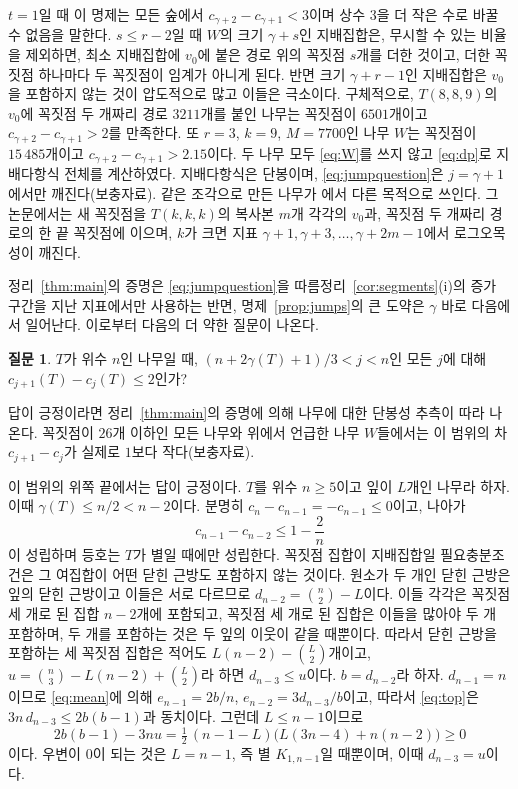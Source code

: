 \documentclass[11pt,a4paper]{article}
\theoremstyle{definition}
\newtheorem{question}[theorem]{질문}
\begin{document}
$t=1$일 때 이 명제는 모든 숲에서 $c_{\gamma+2}-c_{\gamma+1}<3$이며 상수 $3$을 더 작은
수로 바꿀 수 없음을 말한다. $s\le r-2$일 때 $W$의 크기 $\gamma+s$인 지배집합은, 무시할
수 있는 비율을 제외하면, 최소 지배집합에 $v_0$에 붙은 경로 위의 꼭짓점 $s$개를 더한
것이고, 더한 꼭짓점 하나마다 두 꼭짓점이 임계가 아니게 된다. 반면 크기 $\gamma+r-1$인
지배집합은 $v_0$을 포함하지 않는 것이 압도적으로 많고 이들은 극소이다. 구체적으로,
$T(8,8,9)$의 $v_0$에 꼭짓점 두 개짜리 경로 $3211$개를 붙인 나무는 꼭짓점이 $6501$개이고
$c_{\gamma+2}-c_{\gamma+1}>2$를 만족한다. 또 $r=3$, $k=9$, $M=7700$인 나무 $W$는
꼭짓점이 $15\,485$개이고 $c_{\gamma+2}-c_{\gamma+1}>2.15$이다. 두 나무 모두
\eqref{eq:W}를 쓰지 않고 \eqref{eq:dp}로 지배다항식 전체를 계산하였다. 지배다항식은
단봉이며, \eqref{eq:jumpquestion}은 $j=\gamma+1$에서만 깨진다(보충자료). 같은
조각으로 만든 나무가 \cite{DHP}에서 다른 목적으로 쓰인다. 그 논문에서는 새 꼭짓점을
$T(k,k,k)$의 복사본 $m$개 각각의 $v_0$과, 꼭짓점 두 개짜리 경로의 한 끝 꼭짓점에
이으며, $k$가 크면 지표 $\gamma+1,\gamma+3,\dots,\gamma+2m-1$에서 로그오목성이
깨진다.

정리~\ref{thm:main}의 증명은 \eqref{eq:jumpquestion}을
따름정리~\ref{cor:segments}(i)의 증가 구간을 지난 지표에서만 사용하는 반면,
명제~\ref{prop:jumps}의 큰 도약은 $\gamma$ 바로 다음에서 일어난다. 이로부터 다음의 더
약한 질문이 나온다.

\begin{question}\label{q:jump}
$T$가 위수 $n$인 나무일 때, $(n+2\gamma(T)+1)/3<j<n$인 모든 $j$에 대해
$c_{j+1}(T)-c_j(T)\le2$인가?
\end{question}

답이 긍정이라면 정리~\ref{thm:main}의 증명에 의해 나무에 대한 단봉성 추측이 따라
나온다. 꼭짓점이 $26$개 이하인 모든 나무와 위에서 언급한 나무 $W$들에서는 이 범위의 차
$c_{j+1}-c_j$가 실제로 $1$보다 작다(보충자료).

이 범위의 위쪽 끝에서는 답이 긍정이다. $T$를 위수 $n\ge5$이고 잎이 $L$개인 나무라 하자.
이때 $\gamma(T)\le n/2<n-2$이다. 분명히 $c_n-c_{n-1}=-c_{n-1}\le0$이고, 나아가
\begin{equation}\label{eq:top}
  c_{n-1}-c_{n-2}\le1-\frac2n
\end{equation}
이 성립하며 등호는 $T$가 별일 때에만 성립한다. 꼭짓점 집합이 지배집합일 필요충분조건은 그
여집합이 어떤 닫힌 근방도 포함하지 않는 것이다. 원소가 두 개인 닫힌 근방은 잎의 닫힌
근방이고 이들은 서로 다르므로 $d_{n-2}=\binom n2-L$이다. 이들 각각은 꼭짓점 세 개로 된
집합 $n-2$개에 포함되고, 꼭짓점 세 개로 된 집합은 이들을 많아야 두 개 포함하며, 두 개를
포함하는 것은 두 잎의 이웃이 같을 때뿐이다. 따라서 닫힌 근방을 포함하는 세 꼭짓점
집합은 적어도 $L(n-2)-\binom L2$개이고, $u=\binom n3-L(n-2)+\binom L2$라 하면
$d_{n-3}\le u$이다. $b=d_{n-2}$라 하자. $d_{n-1}=n$이므로 \eqref{eq:mean}에 의해
$e_{n-1}=2b/n$, $e_{n-2}=3d_{n-3}/b$이고, 따라서 \eqref{eq:top}은
$3n\,d_{n-3}\le2b(b-1)$과 동치이다. 그런데 $L\le n-1$이므로
\[
  2b(b-1)-3nu=\tfrac12\,(n-1-L)\bigl(L(3n-4)+n(n-2)\bigr)\ge0
\]
이다. 우변이 $0$이 되는 것은 $L=n-1$, 즉 별 $K_{1,n-1}$일 때뿐이며, 이때
$d_{n-3}=u$이다.
\end{document}

